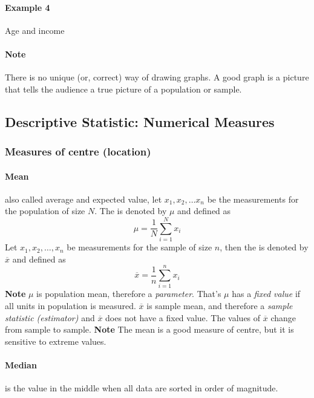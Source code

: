 \documentclass[11pt]{article}
\begin{document}
	\paragraph{Example 4} Age and income
	
	\paragraph{Note} There is no unique (or, correct) way of drawing graphs. A good graph is a picture that tells the audience a true picture of a population or sample.
	
	\subsection{Descriptive Statistic: Numerical Measures}
	\subsubsection{Measures of centre (location)}
	\paragraph{Mean} also called average and expected value, let $x_1, x_2, \dots x_n$ be the measurements for the population of size $N$. The  is denoted by $\mu$ and defined as 
	\[
		\mu = \frac{1}{N} \sum_{i=1}^N x_i
	\] Let $x_1, x_2, \dots, x_n$ be measurements for the sample of size $n$, then the  is denoted by $\overline{x}$ and defined as
	\[
		\overline{x} = \frac{1}{n} \sum_{i=1}^n x_i
	\]
	\newline
	\textbf{Note} $\mu$ is population mean, therefore a \emph{parameter}. That's $\mu$ has a \emph{fixed value} if all units in population is measured. $\overline{x}$ is sample mean, and therefore a \emph{sample statistic (estimator)} and $\overline{x}$ does not have a fixed value. The values of $\overline{x}$ change from sample to sample.
	\newline
	\textbf{Note} The mean is a good measure of centre, but it is sensitive to extreme values.
	
	\paragraph{Median} is the value in the middle when all data are sorted in order of magnitude.
\end{document}
